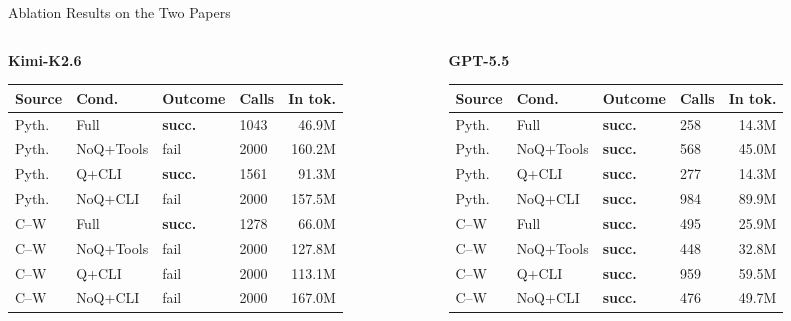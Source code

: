 \documentclass[aspectratio=169,10pt]{beamer}
\newcommand{\kimi}{Kimi-K2.6\xspace}
\newcommand{\gpt}{GPT-5.5\xspace}
\begin{document}
\begin{frame}[t]{Ablation Results on the Two Papers}
\scriptsize
\setlength{\tabcolsep}{2.6pt}
\begin{columns}[T,onlytextwidth]
  \begin{column}{0.49\textwidth}
    \textbf{\kimi}
    \vspace{1mm}

    \begin{tabular}{llllr}
    \toprule
    Source & Cond. & Outcome & Calls & In tok. \\
    \midrule
    Pyth. & Full & \textbf{succ.} & 1043 & 46.9M \\
    Pyth. & NoQ+Tools & fail & 2000 & 160.2M \\
    Pyth. & Q+CLI & \textbf{succ.} & 1561 & 91.3M \\
    Pyth. & NoQ+CLI & fail & 2000 & 157.5M \\
    C--W & Full & \textbf{succ.} & 1278 & 66.0M \\
    C--W & NoQ+Tools & fail & 2000 & 127.8M \\
    C--W & Q+CLI & fail & 2000 & 113.1M \\
    C--W & NoQ+CLI & fail & 2000 & 167.0M \\
    \bottomrule
    \end{tabular}
  \end{column}
  \begin{column}{0.49\textwidth}
    \textbf{\gpt}
    \vspace{1mm}

    \begin{tabular}{llllr}
    \toprule
    Source & Cond. & Outcome & Calls & In tok. \\
    \midrule
    Pyth. & Full & \textbf{succ.} & 258 & 14.3M \\
    Pyth. & NoQ+Tools & \textbf{succ.} & 568 & 45.0M \\
    Pyth. & Q+CLI & \textbf{succ.} & 277 & 14.3M \\
    Pyth. & NoQ+CLI & \textbf{succ.} & 984 & 89.9M \\
    C--W & Full & \textbf{succ.} & 495 & 25.9M \\
    C--W & NoQ+Tools & \textbf{succ.} & 448 & 32.8M \\
    C--W & Q+CLI & \textbf{succ.} & 959 & 59.5M \\
    C--W & NoQ+CLI & \textbf{succ.} & 476 & 49.7M \\
    \bottomrule
    \end{tabular}
  \end{column}
\end{columns}


\end{frame}
\end{document}
